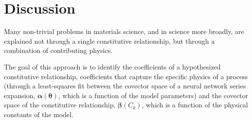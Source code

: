 \section{Discussion}\label{discussion}

Many non-trivial problems in materials science, and in science more broadly, are explained not through a single constitutive relationship, but through a combination of contributing physics.

%
%

The goal of this approach is to identify the coefficients of a hypothesized constitutive relationship, coefficients that capture the specific physics of a process (through a least-squares fit between the covector space of a neural network series expansion, $\boldsymbol{\alpha}(\boldsymbol{\theta})$, which is a function of the model parameters) and the covector space of the constitutive relationship, $\boldsymbol{\beta}(C_k)$, which is a function of the physical constants of the model.

